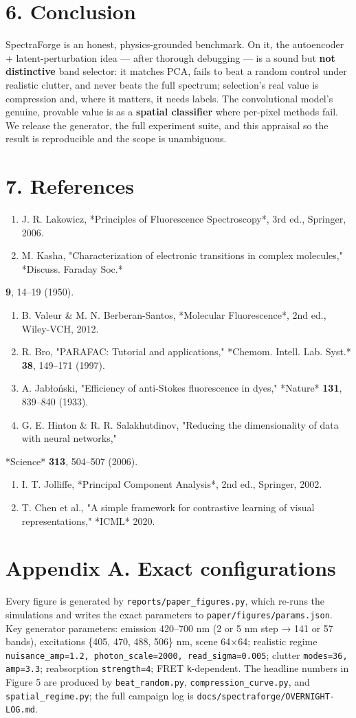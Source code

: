 \documentclass[11pt]{article}
\newcommand{\code}[1]{\texttt{\textcolor{codecol}{#1}}}
\begin{document}
\section*{6. Conclusion}
SpectraForge is an honest, physics-grounded benchmark. On it, the autoencoder + latent-perturbation idea
— after thorough debugging — is a sound but \textbf{not distinctive} band selector: it matches PCA, fails to
beat a random control under realistic clutter, and never beats the full spectrum; selection's real value
is compression and, where it matters, it needs labels. The convolutional model's genuine, provable value
is as a \textbf{spatial classifier} where per-pixel methods fail. We release the generator, the full
experiment suite, and this appraisal so the result is reproducible and the scope is unambiguous.
\section*{7. References}
\begin{enumerate}
\item J. R. Lakowicz, *Principles of Fluorescence Spectroscopy*, 3rd ed., Springer, 2006.
\item M. Kasha, "Characterization of electronic transitions in complex molecules," *Discuss. Faraday Soc.*
\end{enumerate}
\textbf{9}, 14–19 (1950).
\begin{enumerate}
\item B. Valeur \& M. N. Berberan-Santos, *Molecular Fluorescence*, 2nd ed., Wiley-VCH, 2012.
\item R. Bro, "PARAFAC: Tutorial and applications," *Chemom. Intell. Lab. Syst.* \textbf{38}, 149–171 (1997).
\item A. Jabłoński, "Efficiency of anti-Stokes fluorescence in dyes," *Nature* \textbf{131}, 839–840 (1933).
\item G. E. Hinton \& R. R. Salakhutdinov, "Reducing the dimensionality of data with neural networks,"
\end{enumerate}
*Science* \textbf{313}, 504–507 (2006).
\begin{enumerate}
\item I. T. Jolliffe, *Principal Component Analysis*, 2nd ed., Springer, 2002.
\item T. Chen et al., "A simple framework for contrastive learning of visual representations," *ICML* 2020.
\end{enumerate}
\section*{Appendix A. Exact configurations}
Every figure is generated by \code{reports/paper\_figures.py}, which re-runs the simulations and writes the
exact parameters to \code{paper/figures/params.json}. Key generator parameters: emission 420–700 nm
(2 or 5 nm step → 141 or 57 bands), excitations \{405, 470, 488, 506\} nm, scene 64×64; realistic regime
\code{nuisance\_amp=1.2, photon\_scale=2000, read\_sigma=0.005}; clutter \code{modes=36, amp=3.3}; reabsorption
\code{strength=4}; FRET \code{k}-dependent. The headline numbers in Figure 5 are produced by \code{beat\_random.py},
\code{compression\_curve.py}, and \code{spatial\_regime.py}; the full campaign log is \code{docs/spectraforge/OVERNIGHT-LOG.md}.
\end{document}
